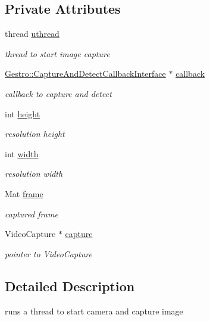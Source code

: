 \subsection*{Private Attributes}
\begin{DoxyCompactItemize}
\item 
thread \hyperlink{class_gesture_detection_1_1_capture_a1eb079eb874f1d4246d1f4f33a66f13f}{uthread}
\begin{DoxyCompactList}\small\item\em thread to start image capture \end{DoxyCompactList}\item 
\hyperlink{class_gestro_1_1_capture_and_detect_callback_interface}{Gestro\+::\+Capture\+And\+Detect\+Callback\+Interface} $\ast$ \hyperlink{class_gesture_detection_1_1_capture_a1e3b24bb47bd38304293b13f72e330a0}{callback}
\begin{DoxyCompactList}\small\item\em callback to capture and detect \end{DoxyCompactList}\item 
int \hyperlink{class_gesture_detection_1_1_capture_abcfde50571827b62b1b634b7da10832d}{height}
\begin{DoxyCompactList}\small\item\em resolution height \end{DoxyCompactList}\item 
int \hyperlink{class_gesture_detection_1_1_capture_ad3a6d053234b05f0d5004014f8c74f9f}{width}
\begin{DoxyCompactList}\small\item\em resolution width \end{DoxyCompactList}\item 
Mat \hyperlink{class_gesture_detection_1_1_capture_ae91c88b7342fe1ff305a52d9a7114b55}{frame}
\begin{DoxyCompactList}\small\item\em captured frame \end{DoxyCompactList}\item 
Video\+Capture $\ast$ \hyperlink{class_gesture_detection_1_1_capture_a43fc54a372cf9e8321f0db49315bfbf4}{capture}
\begin{DoxyCompactList}\small\item\em pointer to Video\+Capture \end{DoxyCompactList}\end{DoxyCompactItemize}


\subsection{Detailed Description}
runs a thread to start camera and capture image 

